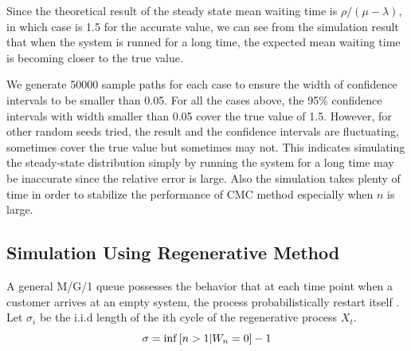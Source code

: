 \documentclass{article}
\begin{document}
Since the theoretical result of the steady state mean waiting time is $\rho/{(\mu - \lambda)}$, in which case is 1.5 for the accurate value, we can see from the simulation result that when the system is runned for a long time, the expected mean waiting time is becoming closer to the true value. 

We generate 50000 sample paths for each case to ensure the width of confidence intervals to be smaller than 0.05. For all the cases above, the 95\% confidence intervals with width smaller than 0.05 cover the true value of 1.5.
However, for other random seeds tried, the result and the confidence intervals are fluctuating, sometimes cover the true value but sometimes may not. This indicates simulating the steady-state distribution simply by running the system for a long time may be inaccurate since the relative error is large. Also the simulation takes plenty of time in order to stabilize the performance of CMC method especially when $n$ is large.


\subsection{Simulation Using Regenerative Method}
A general M/G/1 queue possesses the behavior that at each time point when a customer arrives at an empty system, the process probabilistically restart itself \citep{rubinstein2016simulation}. Let $\sigma_i$ be the i.i.d length of the ith cycle of the regenerative process {$X_t$}. 
\begin{equation}
	\sigma = {\rm inf}\left[n>1|W_n=0\right]-1
\end{equation}
\end{document}
